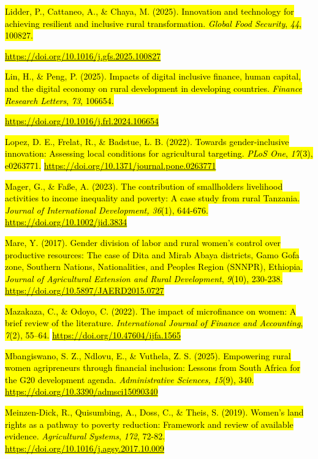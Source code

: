\hl{Lidder, P., Cattaneo, A., \& Chaya, M. (2025). Innovation and
technology for achieving resilient and inclusive rural transformation.
\emph{Global Food Security}, \emph{44}, 100827.}

\href{https://doi.org/10.1016/j.gfs.2025.100827}{\hl{https://doi.org/10.1016/j.gfs.2025.100827}}

\hl{Lin, H., \& Peng, P. (2025). Impacts of digital inclusive finance,
human capital, and the digital economy on rural development in
developing countries. \emph{Finance Research Letters}, \emph{73},
106654.}

\href{https://doi.org/10.1016/j.frl.2024.106654}{\hl{https://doi.org/10.1016/j.frl.2024.106654}}

\hl{Lopez, D. E., Frelat, R., \& Badstue, L. B. (2022). Towards
gender-inclusive innovation: Assessing local conditions for agricultural
targeting. \emph{PLoS One}, \emph{17}(3), e0263771.}
\href{https://doi.org/10.1371/journal.pone.0263771}{\hl{https://doi.org/10.1371/journal.pone.0263771}}

\hl{Mager, G., \& Faße, A. (2023). The contribution of
smallholders\textquotesingle{} livelihood activities to income
inequality and poverty: A case study from rural Tanzania. \emph{Journal
of International Development, 36}(1), 644-676.}
\href{https://doi.org/10.1002\%2Fjid.3834}{\hl{https://doi.org/10.1002/jid.3834}}

\hl{Mare, Y. (2017). Gender division of labor and rural women's control
over productive resources: The case of Dita and Mirab Abaya districts,
Gamo Gofa zone, Southern Nations, Nationalities, and Peoples Region
(SNNPR), Ethiopia. \emph{Journal of Agricultural Extension and Rural
Development}, \emph{9}(10), 230-238.}
\href{https://doi.org/10.5897/JAERD2015.0727}{\hl{https://doi.org/10.5897/JAERD2015.0727}}

\hl{Mazakaza, C., \& Odoyo, C. (2022). The impact of microfinance on
women: A brief review of the literature. \emph{International Journal of
Finance and Accounting}, \emph{7}(2), 55--64.}
\href{https://doi.org/10.47604/ijfa.1565}{\hl{https://doi.org/10.47604/ijfa.1565}}

\hl{Mbangiswano, S. Z., Ndlovu, E., \& Vuthela, Z. S. (2025). Empowering
rural women agripreneurs through financial inclusion: Lessons from South
Africa for the G20 development agenda. \emph{Administrative Sciences,
15}(9), 340.}
\href{https://doi.org/10.3390/admsci15090340}{\hl{https://doi.org/10.3390/admsci15090340}}

\hl{Meinzen-Dick, R., Quisumbing, A., Doss, C., \& Theis, S. (2019).
Women's land rights as a pathway to poverty reduction: Framework and
review of available evidence. \emph{Agricultural Systems}, \emph{172},
72-82.}
\href{https://doi.org/10.1016/j.agsy.2017.10.009}{\hl{https://doi.org/10.1016/j.agsy.2017.10.009}}

